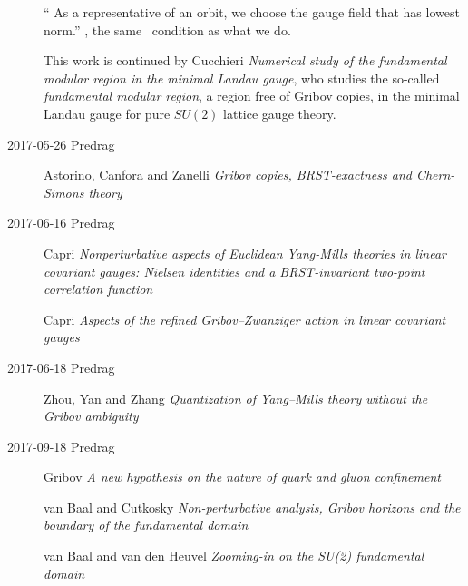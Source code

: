 \begin{description}
``
As a representative of an orbit, we choose the gauge field that has
lowest norm.'' \ie, the same \slice\ condition as what we do.

This work is continued by Cucchieri {\em Numerical study
of the fundamental modular region in the minimal {Landau} gauge}, who
studies the so-called \emph{fundamental modular region}, a
region free of Gribov copies, in the minimal Landau gauge for pure $SU(2)$
lattice gauge theory.

\item[2017-05-26 Predrag]
Astorino, Canfora and Zanelli
{\em Gribov copies, BRST-exactness and Chern-Simons theory}

\item[2017-06-16 Predrag]
Capri \etal{}
{\em Nonperturbative aspects of {Euclidean Yang-Mills} theories in linear
covariant gauges: {Nielsen} identities and a {BRST}-invariant two-point
correlation function}

Capri \etal{}
{\em Aspects of the refined {Gribov–Zwanziger} action in linear covariant gauges}

\item[2017-06-18 Predrag]
Zhou, Yan and Zhang
{\em Quantization of {Yang–Mills} theory without the {Gribov} ambiguity}

\item[2017-09-18 Predrag]
Gribov
{\em A new hypothesis on the nature of quark and gluon confinement}

van Baal and Cutkosky {\em Non-perturbative analysis, {Gribov}
horizons and the boundary of the fundamental domain}

van Baal and van den Heuvel
{\em Zooming-in on the {SU(2)} fundamental domain}

\end{description}
\renewcommand{\ssp}{a}

\printbibliography[heading=subbibintoc,title={References}]
